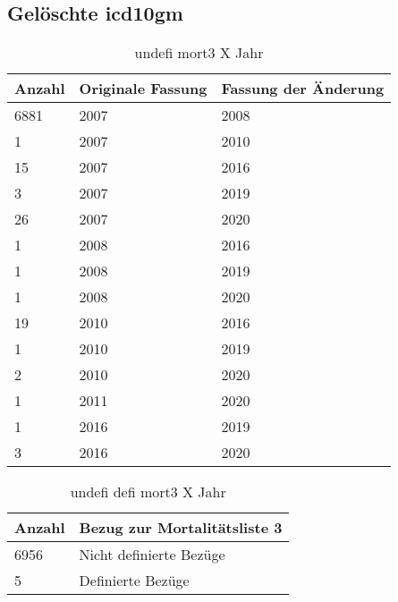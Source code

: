 \newpage
\subsection{Gelöschte \acs{icd10gm}}
\newpage
\begin{table}[t]
	\centering
	\caption[Undefinierte Bezüge zur Mortalitätsliste 3]{undefi mort3 X Jahr}
	\label{tab:mort3}
	\begin{tabular}{|l|l|l|}
		\hline
		\rowcolor{lightgray} Anzahl & Originale Fassung & Fassung der Änderung \\ \hline
		6881 & 2007 & 2008 \\ \hline
		1 & 2007 & 2010 \\ \hline
		15 & 2007 & 2016 \\ \hline
		3 & 2007 & 2019 \\ \hline
		26 & 2007 & 2020 \\ \hline
		1 & 2008 & 2016 \\ \hline
		1 & 2008 & 2019 \\ \hline
		1 & 2008 & 2020 \\ \hline
		19 & 2010 & 2016 \\ \hline
		1 & 2010 & 2019 \\ \hline
		2 & 2010 & 2020 \\ \hline
		1 & 2011 & 2020 \\ \hline
		1 & 2016 & 2019 \\ \hline
		3 & 2016 & 2020 \\ \hline		
	\end{tabular}
\end{table}

\newpage

\begin{table}[ht]
	\centering
	\caption[Undefinierte und definierte Bezüge zur Mortalitätsliste 3]{undefi defi mort3 X Jahr}
	\label{tab:mort3defundef}
	\begin{tabular}{|l|l|}
		\hline
		\rowcolor{lightgray} Anzahl & Bezug zur Mortalitätsliste 3 \\ \hline
		6956 & Nicht definierte Bezüge \\ \hline
		5 & Definierte Bezüge \\ \hline		
	\end{tabular}
\end{table}

\newpage

